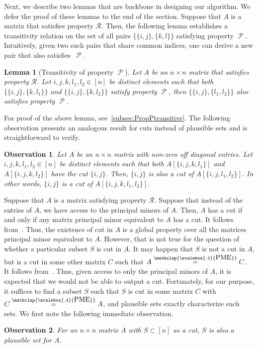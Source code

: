 \documentclass[11pt,letterpaper]{article}
\newtheorem{lemma}{Lemma}[section]
\newtheorem{observation}{Observation}[section]
\DeclareMathOperator{\calP}{\mathcal{P}}
\newcommand{\PME}{\stackrel{\mathclap{\scalebox{.4}{\mbox{PME}}}}{=}}
\newcommand{\prop}{\mathcal{R}}
\begin{document}
{{{Next, we describe two lemmas that are backbone in designing our algorithm. We defer the proof of these lemmas to the end of the section. Suppose that $A$ is a matrix that satisfies property $\prop$. Then, the following lemma establishes a transitivity relation on the set of all pairs $\{\{i, j\}, \{k, l\}\}$ satisfying property $\calP$. Intuitively, given two such pairs that share common indices, one can derive a new pair that also satisfies~$\calP$.
\begin{lemma}[Transitivity of property $\calP$]
\label{lem:PropPtransitive}
Let $A$ be an $n\times n$ matrix that satisfies property $\prop$. Let $i,j,k,l_1,l_2\in [n]$ be distinct elements such that both $\{\{i,j\},\{k,l_1\}\}$ and $\{\{i,j\},\{k,l_2\}\}$ satisfy property $\calP$, then $\{\{i,j\},\{l_1,l_2\}\}$ also satisfies property $\calP$.
\end{lemma}
For proof of the above lemma, see~\cref{subsec:PropPtransitive}. The following observation presents an analogous result for cuts instead of plausible sets and is straightforward to verify.
\begin{observation}\label{obs:cutTransitive}
Let $A$ be an $n\times n$ matrix with non-zero off diagonal entries. Let $i,j,k,l_1,l_2\in [n]$ be distinct elements such that both $A[\{i,j,k,l_1\}]$ and $A[\{i,j,k,l_2\}]$ have the cut $\{i,j\}$. Then, $\{i,j\}$  is also a cut of $A[\{i,j,l_1,l_2\}]$. In other words, $\{i,j\}$ is a cut of $A[\{i,j,k,l_1,l_2\}]$.
\end{observation}

Suppose that $A$ is a matrix satisfying property $\prop$. Suppose that instead of the entries of $A$, we have access to the principal minors of $A$. Then, $A$ has a cut if and only if any matrix principal minor equivalent to $A$ has a cut. It follows from~\cite[Theorem~1.1]{Chatterjee25}. Thus, the existence of cut in $A$ is a global property over all the matrices principal minor equivalent to $A$. However, that is not true for the question of whether a particular subset $S$ is cut in $A$. It may happen that $S$ is not a cut in $A$, but is a cut in some other matrix $C$ such that $A\PME C$.  It follows from~\cite[Theorem~1.1 and Lemma~3.2]{Chatterjee25}. Thus, given access to only the principal minors of $A$, it is expected that we would not be able to output a cut. Fortunately, for our purpose, it suffices to find a subset $S$ such that $S$ is cut in some matrix $C$ with $C\PME A$, and plausible sets exactly characterize such sets. We first note the following immediate observation.
\begin{observation}\label{obs:PlausibleImpCut}
For an $n\times n$ matrix $A$ with $S\subset [n]$ as a cut, $S$ is also a plausible set for $A$.
\end{observation}

}}}
\end{document}
